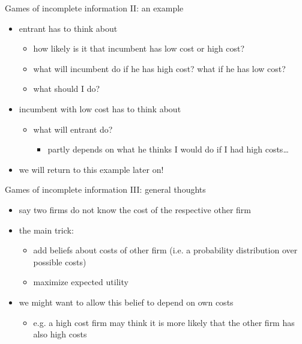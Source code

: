 \documentclass[bigger]{beamer}
\begin{document}
\begin{frame}[label={sec:orga91b360}]{Games of incomplete information II: an example}
\begin{itemize}
\item entrant has to think about
\begin{itemize}
\item how likely is it that incumbent has low cost or high cost?
\item what will incumbent do if he has high cost? what if he has low cost?
\item what should I do?
\end{itemize}

\item incumbent with low cost has to think about
\begin{itemize}
\item what will entrant do?
\begin{itemize}
\item partly depends on what he thinks I would do if I had high costs\ldots{}
\end{itemize}
\end{itemize}

\item we will return to this example later on!
\end{itemize}
\end{frame}
\begin{frame}[label={sec:org00ce779}]{Games of incomplete information III: general thoughts}
\begin{itemize}
\item say two firms do not know the cost of the respective other firm
\item the main trick:
\begin{itemize}
\item add beliefs about costs of other firm (i.e. a probability distribution over possible costs)
\item maximize expected utility
\end{itemize}
\item we might want to allow this belief to depend on own costs
\begin{itemize}
\item e.g. a high cost firm may think it is more likely that the other firm has also high costs
\end{itemize}
\end{itemize}
\end{frame}
\end{document}
